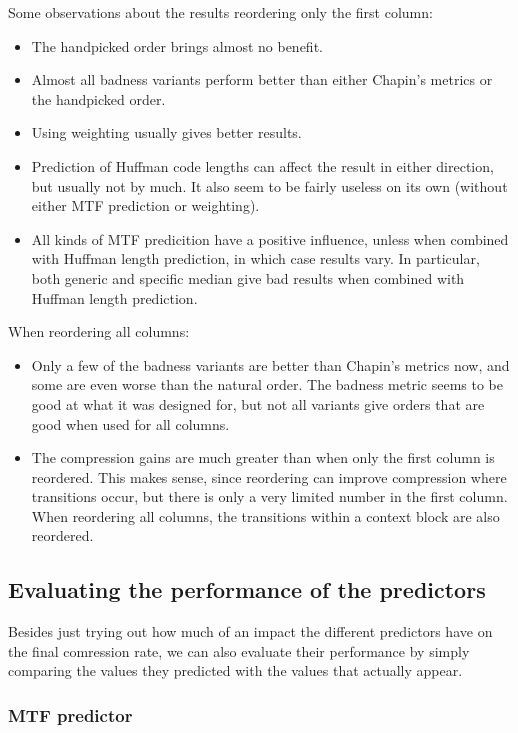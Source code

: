 \documentclass[a4paper]{scrreprt}
\begin{document}
Some observations about the results reordering only the first column:
\begin{itemize}
  \item The handpicked order brings almost no benefit.
  \item Almost all badness variants perform better than either Chapin's
  metrics or the handpicked order.
  \item Using weighting usually gives better results.
  \item Prediction of Huffman code lengths can affect the result in either
  direction, but usually not by much. It also seem to be fairly useless on its
  own (without either MTF prediction or weighting).
  \item All kinds of MTF predicition have a positive influence, unless when
  combined with Huffman length prediction, in which case results vary. In
  particular, both generic and specific median give bad results when combined
  with Huffman length prediction.
\end{itemize}

When reordering all columns:
\begin{itemize}
  \item Only a few of the badness variants are better than Chapin's metrics now,
  and some are even worse than the natural order. The badness metric seems to be
  good at what it was designed for, but not all variants give orders that are
  good when used for all columns.
  \item The compression gains are much greater than when only the first column
  is reordered. This makes sense, since reordering can improve compression where
  transitions occur, but there is only a very limited number in the first
  column. When reordering all columns, the transitions within a context block
  are also reordered.
\end{itemize}

\subsection{Evaluating the performance of the predictors}

Besides just trying out how much of an impact the different predictors have on
the final comression rate, we can also evaluate their performance by simply
comparing the values they predicted with the values that actually appear.

\subsubsection{MTF predictor}
\end{document}
